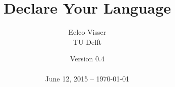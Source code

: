 \newcommand{\Version}{0.4}

\title{Declare Your Language}
	
\author{Eelco Visser\\[20pt]TU Delft\\[20pt]}
	
\date{Version \Version \\\ \\June 12, 2015 -- \today}
	



%





%
%



	

